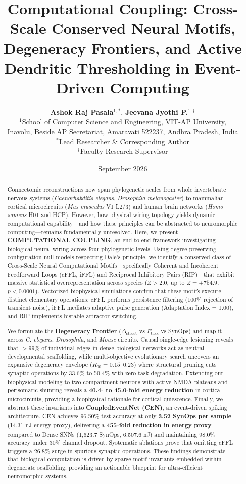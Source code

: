 \documentclass[10pt,twocolumn,letterpaper]{article}
\title{\textbf{Computational Coupling: Cross-Scale Conserved Neural Motifs, Degeneracy Frontiers, and Active Dendritic Thresholding in Event-Driven Computing}}
\author{
  \textbf{Ashok Raj Pasala}$^{1,*}$, \quad \textbf{Jeevana Jyothi P.}$^{1,\dagger}$ \\[4pt]
  \small $^{1}$School of Computer Science and Engineering, VIT-AP University,\\
  \small Inavolu, Beside AP Secretariat, Amaravati 522237, Andhra Pradesh, India\\[2pt]
  \small $^{*}$Lead Researcher \& Corresponding Author\\
  \small $^{\dagger}$Faculty Research Supervisor
}
\date{September 2026}
\begin{document}
\maketitle

\begin{abstract}
Connectomic reconstructions now span phylogenetic scales from whole invertebrate nervous systems (\textit{Caenorhabditis elegans}, \textit{Drosophila melanogaster}) to mammalian cortical microcircuits (\textit{Mus musculus} V1 L2/3) and human brain networks (\textit{Homo sapiens} H01 and HCP). However, how physical wiring topology yields dynamic computational capability---and how these principles can be abstracted to neuromorphic computing---remains fundamentally unresolved. Here, we present \textbf{COMPUTATIONAL COUPLING}, an end-to-end framework investigating biological neural wiring across four phylogenetic levels. Using degree-preserving configuration null models respecting Dale's principle, we identify a conserved class of Cross-Scale Neural Computational Motifs---specifically Coherent and Incoherent Feedforward Loops (cFFL, iFFL) and Reciprocal Inhibitory Pairs (RIP)---that exhibit massive statistical overrepresentation across species ($Z > 2.0$, up to $Z = +754.9$, $p < 0.0001$). Vectorized biophysical simulations confirm that these motifs execute distinct elementary operations: cFFL performs persistence filtering (100\% rejection of transient noise), iFFL mediates adaptive pulse generation (Adaptation Index = 1.00), and RIP implements bistable attractor switching.

We formulate the \textbf{Degeneracy Frontier} ($\Delta_{\mathrm{struct}}$ vs $F_{\mathrm{task}}$ vs SynOps) and map it across \textit{C. elegans}, \textit{Drosophila}, and \textit{Mouse} circuits. Causal single-edge lesioning reveals that $>99\%$ of individual edges in dense biological networks act as neutral developmental scaffolding, while multi-objective evolutionary search uncovers an expansive degeneracy envelope ($R_{90} = 0.15\text{--}0.23$) where structural pruning cuts synaptic operations by 33.6\% to 50.4\% with zero task degradation. Extending our biophysical modeling to two-compartment neurons with active NMDA plateaus and perisomatic shunting reveals a \textbf{40.4- to 45.0-fold energy reduction} in cortical microcircuits, providing a biophysical rationale for cortical quiescence. Finally, we abstract these invariants into \textbf{CoupledEventNet (CEN)}, an event-driven spiking architecture. CEN achieves 96.50\% test accuracy at only \textbf{3.52 SynOps per sample} (14.31 nJ energy proxy), delivering a \textbf{455-fold reduction in energy proxy} compared to Dense SNNs (1,623.7 SynOps, 6,507.6 nJ) and maintaining 98.0\% accuracy under 30\% channel dropout. Systematic ablations prove that omitting cFFL triggers a 26.8\% surge in spurious synaptic operations. These findings demonstrate that biological computation is driven by sparse motif invariants embedded within degenerate scaffolding, providing an actionable blueprint for ultra-efficient neuromorphic systems.
\end{abstract}
\end{document}
